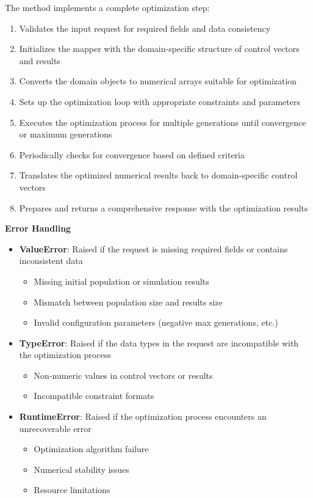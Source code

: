 \begin{itemize}
	The method implements a complete optimization step:
	\begin{enumerate}
		\item Validates the input request for required fields and data consistency
		\item Initializes the mapper with the domain-specific structure of control vectors and results
		\item Converts the domain objects to numerical arrays suitable for optimization
		\item Sets up the optimization loop with appropriate constraints and parameters
		\item Executes the optimization process for multiple generations until convergence or maximum generations
		\item Periodically checks for convergence based on defined criteria
		\item Translates the optimized numerical results back to domain-specific control vectors
		\item Prepares and returns a comprehensive response with the optimization results
	\end{enumerate}

	\textbf{Error Handling}
	\begin{itemize}
		\item \textbf{ValueError}: Raised if the request is missing required fields or contains inconsistent data
		\begin{itemize}
			\item Missing initial population or simulation results
			\item Mismatch between population size and results size
			\item Invalid configuration parameters (negative max generations, etc.)
		\end{itemize}
		
		\item \textbf{TypeError}: Raised if the data types in the request are incompatible with the optimization process
		\begin{itemize}
			\item Non-numeric values in control vectors or results
			\item Incompatible constraint formats
		\end{itemize}
		
		\item \textbf{RuntimeError}: Raised if the optimization process encounters an unrecoverable error
		\begin{itemize}
			\item Optimization algorithm failure
			\item Numerical stability issues
			\item Resource limitations
		\end{itemize}
		

\end{itemize}
\end{itemize}
